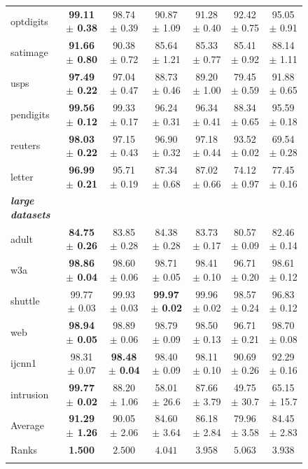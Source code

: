 \documentclass{article}
\begin{document}
\begin{figure}[t!]
\begin{minipage}{0.8\textwidth}
{\begin{tabular}{l@{\extracolsep{\fill}}cccccc}
optdigits & \textbf{99.11 $\pm$ 0.38} & 98.74 $\pm$ 0.39 & 90.87 $\pm$ 1.09 & 91.28 $\pm$ 0.40 & 92.42 $\pm$ 0.75 & 95.05 $\pm$ 0.91 \\
satimage & \textbf{91.66 $\pm$ 0.80} & 90.38 $\pm$ 0.72 & 85.64 $\pm$ 1.21 & 85.33 $\pm$ 0.77 & 85.41 $\pm$ 0.92 & 88.14 $\pm$ 1.11 \\
usps & \textbf{97.49 $\pm$ 0.22} & 97.04 $\pm$ 0.47 & 88.73 $\pm$ 0.46 & 89.20 $\pm$ 1.00 & 79.45 $\pm$ 0.59 & 91.88 $\pm$ 0.65 \\
pendigits & \textbf{99.56 $\pm$ 0.12} & 99.33 $\pm$ 0.17 & 96.24 $\pm$ 0.31 & 96.34 $\pm$ 0.41 & 88.34 $\pm$ 0.65 & 95.59 $\pm$ 0.18 \\
reuters & \textbf{98.03 $\pm$ 0.22} & 97.15 $\pm$ 0.43 & 96.90 $\pm$ 0.32 & 97.18 $\pm$ 0.44 & 93.52 $\pm$ 0.02 & 69.54 $\pm$ 0.28 \\
letter & \textbf{96.99 $\pm$ 0.21} & 95.71 $\pm$ 0.19 & 87.34 $\pm$ 0.68 & 87.02 $\pm$ 0.66 & 74.12 $\pm$ 0.97 & 77.45 $\pm$ 0.16 \\
\textbf{\textit{large datasets}} & & & & & & \\
adult & \textbf{84.75 $\pm$ 0.26} & 83.85 $\pm$ 0.28 & 84.38 $\pm$ 0.28 & 83.73 $\pm$ 0.17 & 80.57 $\pm$ 0.09 & 82.46 $\pm$ 0.14 \\
w3a & \textbf{98.86 $\pm$ 0.04} & 98.60 $\pm$ 0.06 & 98.71 $\pm$ 0.05 & 98.41 $\pm$ 0.10 & 96.71 $\pm$ 0.20 & 98.61 $\pm$ 0.12 \\
shuttle & 99.77 $\pm$ 0.03 & 99.93 $\pm$ 0.03 & \textbf{99.97 $\pm$ 0.02} & 99.96 $\pm$ 0.02 & 98.57 $\pm$ 0.24 & 96.83 $\pm$ 0.12 \\
web & \textbf{98.94 $\pm$ 0.05} & 98.89 $\pm$ 0.06 & 98.79 $\pm$ 0.09 & 98.50 $\pm$ 0.13 & 96.71 $\pm$ 0.21 & 98.70 $\pm$ 0.08 \\
ijcnn1 & 98.31 $\pm$ 0.07 & \textbf{98.48 $\pm$ 0.04} & 98.40 $\pm$ 0.09 & 98.11 $\pm$ 0.10 & 90.69 $\pm$ 0.26 & 92.29 $\pm$ 0.16 \\
intrusion & \textbf{99.77 $\pm$ 0.02} & 88.20 $\pm$ 1.06 & 58.01 $\pm$ 26.6 & 87.66 $\pm$ 3.79 & 49.75 $\pm$ 30.7 & 65.15 $\pm$ 15.7 \\
\noalign{\smallskip}\hline\noalign{\smallskip}
Average & \textbf{91.29 $\pm$ 1.26} & 90.05 $\pm$ 2.06 & 84.60 $\pm$ 3.64 & 86.18 $\pm$ 2.84 & 79.96 $\pm$ 3.58 & 84.45 $\pm$ 2.83 \\
Ranks & \textbf{1.500} & $2.500$ & $4.041$ & $3.958$ & $5.063$ & $3.938$ \\
\noalign{\smallskip}\hline\noalign{\smallskip}
\end{tabular}}
\end{minipage}
\hspace{1em}
\begin{minipage}{0.13\textwidth}
\centering
{}
\end{minipage}
\end{figure}
\end{document}
